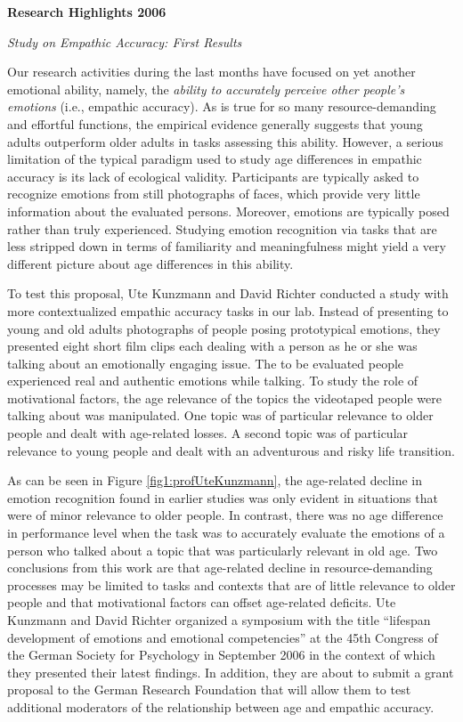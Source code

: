 \null
\textbf{Research Highlights 2006}

\textit{Study on Empathic Accuracy: First Results}

 Our research activities during the last months have focused on yet another emotional ability, namely, the \textit{ability to accurately perceive other people's emotions} (i.e., empathic accuracy). As is true for so many resource-demanding and effortful functions, the empirical evidence generally suggests that young adults outperform older adults in tasks assessing this ability. However, a serious limitation of the typical paradigm used to study age differences in empathic accuracy is its lack of ecological validity. Participants are typically asked to recognize emotions from still photographs of faces, which provide very little information about the evaluated persons. Moreover, emotions are typically posed rather than truly experienced. Studying emotion recognition via tasks that are less stripped down in terms of familiarity and meaningfulness might yield a very different picture about age differences in this ability.  

 To test this proposal, Ute Kunzmann and David Richter conducted a study with more contextualized empathic accuracy tasks in our lab. Instead of presenting to young and old adults photographs of people posing prototypical emotions, they presented eight short film clips each dealing with a person as he or she was talking about an emotionally engaging issue. The to be evaluated people experienced real and authentic emotions while talking. To study the role of motivational factors, the age relevance of the topics the videotaped people were talking about was manipulated. One topic was of particular relevance to older people and dealt with age-related losses. A second topic was of particular relevance to young people and dealt with an adventurous and risky life transition. 

 As can be seen in Figure \ref{fig1:profUteKunzmann}, the age-related decline in emotion recognition found in earlier studies was only evident in situations that were of minor relevance to older people. In contrast, there was no age difference in performance level when the task was to accurately evaluate the emotions of a person who talked about a topic that was particularly relevant in old age. Two conclusions from this work are that age-related decline in resource-demanding processes may be limited to tasks and contexts that are of little relevance to older people and that motivational factors can offset age-related deficits. Ute Kunzmann and David Richter organized a symposium with the title ``lifespan development of emotions and emotional competencies'' at the 45th Congress of the German Society for Psychology in September 2006 in the context of which they presented their latest findings. In addition, they are about to submit a grant proposal to the German Research Foundation that will allow them to test additional moderators of the relationship between age and empathic accuracy.

